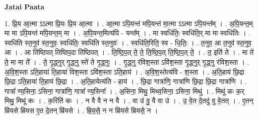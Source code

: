 \documentclass[17pt]{extarticle}
\begin{document}
\textbf{Jatai Paata} \newline

1. प्रि॒य आ॒त्मा ऽऽत्मा प्रि॒यः प्रि॒य आ॒त्मा । . आ॒त्मा ऽपि॒यन्त॑ मपि॒यन्त॑ मा॒त्मा ऽऽत्मा ऽपि॒यन्त᳚म् । . अ॒पि॒यन्त॒म् मा मा ऽपि॒यन्त॑ मपि॒यन्त॒म् मा । . अ॒पि॒यन्त॒मित्य॑पि - यन्त᳚म् । . मा स्वधि॑तिः॒ स्वधि॑ति॒र् मा मा स्वधि॑तिः । . स्वधि॑ति स्त॒नुव॑ स्त॒नुवः॒ स्वधि॑तिः॒ स्वधि॑ति स्त॒नुवः॑ । . स्वधि॑ति॒रिति॒ स्व - धि॒तिः॒ । . त॒नुव॒ आ त॒नुव॑ स्त॒नुव॒ आ । . आ ति॑ष्ठिपत् तिष्ठिप॒दा ति॑ष्ठिपत् । . ति॒ष्ठि॒प॒त् ते॒ ते॒ ति॒ष्ठि॒प॒त् ति॒ष्ठि॒प॒त् ते॒ । . त॒ इति॑ ते । . मा ते॑ ते॒ मा मा ते᳚ । . ते॒ गृ॒द्ध्नुर् गृ॒द्ध्नु स्ते॑ ते गृ॒द्ध्नुः । . गृ॒द्ध्नु र॑विश॒स्ता ऽवि॑श॒स्ता गृ॒द्ध्नुर् गृ॒द्ध्नु र॑विश॒स्ता । . अ॒वि॒श॒स्ता ऽति॒हाया॑ ति॒हाया॑ विश॒स्ता ऽवि॑श॒स्ता ऽति॒हाय॑ । . अ॒वि॒श॒स्तेत्य॑वि - श॒स्ता । . अ॒ति॒हाय॑ छि॒द्रा छि॒द्रा ऽति॒हाया॑ ति॒हाय॑ छि॒द्रा । . अ॒ति॒हायेत्य॑ति - हाय॑ । . छि॒द्रा गात्रा॑णि॒ गात्रा॑णि छि॒द्रा छि॒द्रा गात्रा॑णि । . गात्रा᳚ ण्य॒सिना॒ ऽसिना॒ गात्रा॑णि॒ गात्रा᳚ ण्य॒सिना᳚ । . अ॒सिना॒ मिथु॒ मिथ्व॒सिना॒ ऽसिना॒ मिथु॑ । . मिथू॑ कः क॒र् मिथु॒ मिथू॑ कः । . क॒रिति॑ कः । . न वै वै न न वै । . वा उ॑ वु॒ वै वा उ॑ । . उ॒ वे॒त दे॒तदु॑ वु वे॒तत् । . ए॒तन् म्रि॑यसे म्रियस ए॒त दे॒तन् म्रि॑यसे । . म्रि॒य॒से॒ न न म्रि॑यसे म्रियसे॒ न । \newline
\end{document}
